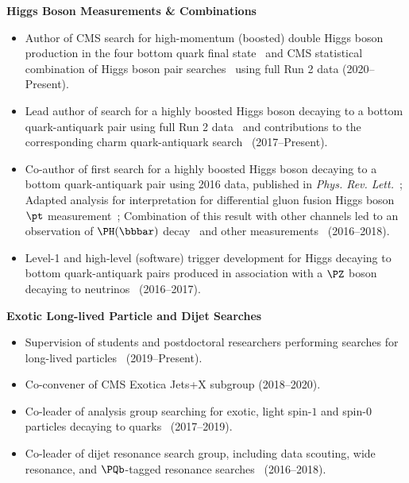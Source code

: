 \documentclass[11pt]{res}
\begin{document}
\begin{resume}
  \textbf{Higgs Boson Measurements \& Combinations}
  \begin{itemize}
    \itemsep-0.3em
    \item Author of CMS search for high-momentum (boosted) double Higgs boson production in the four bottom quark final state~\cite{CMS:2022nmn} and CMS statistical combination of Higgs boson pair searches~\cite{CMS:2022dwd} using full Run 2 data ({2020--Present}).
    \item Lead author of search for a highly boosted Higgs boson decaying to a bottom quark-antiquark pair using full Run 2 data~\cite{Sirunyan:2020hwz} and contributions to the corresponding charm quark-antiquark search~\cite{CMS:2022wqf} ({2017--Present}).
    \item Co-author of first search for a highly boosted Higgs boson decaying to a bottom quark-antiquark pair using 2016 data, published in \emph{Phys. Rev. Lett.}~\cite{Sirunyan:2017dgc}; Adapted analysis for interpretation for differential gluon fusion Higgs boson $\pt$ measurement~\cite{Sirunyan:2018sgc}; Combination of this result with other channels led to an observation of $\PH(\bbbar)$ decay~\cite{Sirunyan:2018kst} and other measurements~\cite{Sirunyan:2018koj} ({2016--2018}).
    \item Level-1 and high-level (software) trigger development for Higgs decaying to bottom quark-antiquark pairs produced in association with a $\PZ$ boson decaying to neutrinos~\cite{Sirunyan:2018kst} ({2016--2017}).
  \end{itemize}

  \textbf{Exotic Long-lived Particle and Dijet Searches}
  \begin{itemize}
    \itemsep-0.3em
    \item Supervision of students and postdoctoral researchers performing searches for long-lived particles~\cite{CMS:2022wjc,CMS:2021yhb,CMS:2021juv} ({2019--Present}).
    \item Co-convener of CMS Exotica Jets+X subgroup ({2018--2020}).
    \item Co-leader of analysis group searching for exotic, light spin-$1$ and spin-$0$ particles decaying to quarks~\cite{Sirunyan:2019vxa,Sirunyan:2019sgo,Sirunyan:2018ikr,Sirunyan:2017nvi} ({2017--2019}).
    \item Co-leader of dijet resonance search group, including data scouting, wide resonance, and $\PQb$-tagged resonance searches~\cite{Sirunyan:2019pnb,Sirunyan:2019vgj,CMS-PAS-EXO-17-026,Duarte:2018bsd,Sirunyan:2018xlo,Sirunyan:2016iap} ({2016--2018}).
  \end{itemize}


\end{resume}
\end{document}
